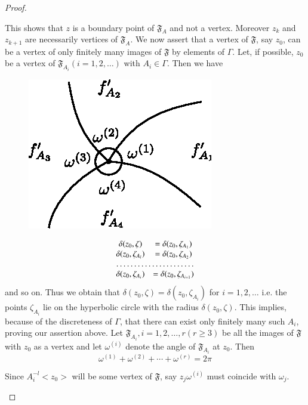 \begin{proof}
\begin{enumerate}
This shows that $z$ is a boundary point of $\mathfrak{F}_A$ and not a
vertex. Moreover $z_k$ and $z_{k+1}$ are necessarily vertices of
$\mathfrak{F}_A$. We now assert that a vertex of $\mathfrak{F}$, say
$z_0$, can be a vertex of only finitely many images of $\mathfrak{F}$
by elements of $\Gamma$. Let, if possible, $z_0$ be a vertex of
$\mathfrak{F}_{A_i}(i=1,2,\ldots)$ with $A_i \in \Gamma$. Then
we have 

\begin{figure}[H]
\centering
\includegraphics{vol29-fig/fig29-7.eps}
\smallskip
\caption{}
\label{chap1:fig7}
\end{figure}
$$
\begin{matrix} 
\delta (z_0, \zeta) & = \delta(z_0, \zeta_{A_1})\\ 
\delta (z_0, \zeta_{A_l}) & = \delta(z_0, \zeta_{A_2})\\
\hdotsfor{2}\\
\delta(z_0, \zeta_{A_i}) & =\delta(z_0, \zeta_{A_{i+1}})
\end{matrix}
$$
and so on. Thus we obtain that 
$\delta(z_0, \zeta) = \delta (z_0,\zeta_{A_i})$ for $i=1,2,\ldots$
i.e. the points $\zeta_{A_i}$ lie on the hyperbolic circle with the
radius $\delta(z_0, \zeta)$. This implies, because of the discreteness
of $\Gamma$, that there can exist only finitely many such $A_i$,
proving our assertion above. Let $\mathfrak{F}_{A_i}, i = 1, 2, \ldots,
r (r\geq 3)$ be all the images of $\mathfrak{F}$ with $z_0$ as a
vertex and let $\omega^{(i)}$ denote the angle of $\mathfrak{F}_{A_i}$
at $z_0$. Then 
\begin{equation*}
\omega^{(1)} + \omega^{(2)} + \cdots + \omega^{(r)} = 2\pi \tag{13}\label{eq3:13}
\end{equation*}

Since $A^{-l}_i <z_0>$ will be some vertex of $\mathfrak{F}$, say $z_j
\omega^{(i)}$ must coincide with $\omega_j$. 


\end{enumerate}
\end{proof}
